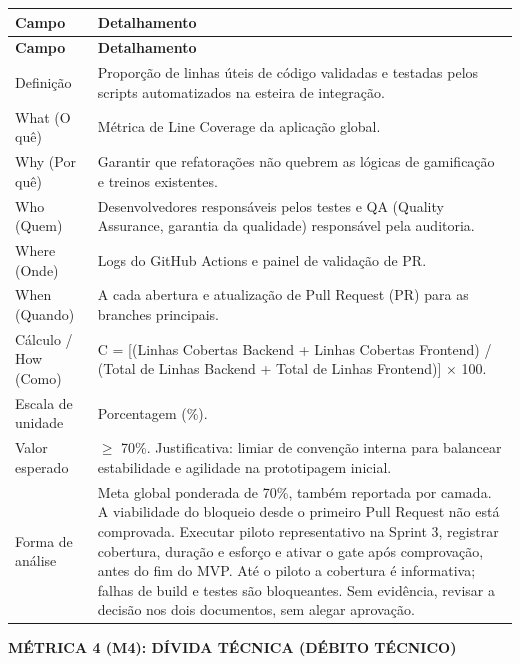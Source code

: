 \begingroup
\small
\setlength{\tabcolsep}{4pt}
\renewcommand{\arraystretch}{1.2}
\begin{longtable}{|>{\raggedright\arraybackslash}p{}|>{\raggedright\arraybackslash}p{}|}
\hline
\textbf{Campo} & \textbf{Detalhamento} \\ \hline
\endfirsthead
\textbf{Campo} & \textbf{Detalhamento} \\ \hline
\endhead
Definição & Proporção de linhas úteis de código validadas e testadas pelos scripts automatizados na esteira de integração. \\ \hline
What (O quê) & Métrica de Line Coverage da aplicação global. \\ \hline
Why (Por quê) & Garantir que refatorações não quebrem as lógicas de gamificação e treinos existentes. \\ \hline
Who (Quem) & Desenvolvedores responsáveis pelos testes e QA (Quality Assurance, garantia da qualidade) responsável pela auditoria. \\ \hline
Where (Onde) & Logs do GitHub Actions e painel de validação de PR. \\ \hline
When (Quando) & A cada abertura e atualização de Pull Request (PR) para as branches principais. \\ \hline
Cálculo / How (Como) & C = [(Linhas Cobertas Backend + Linhas Cobertas Frontend) / (Total de Linhas Backend + Total de Linhas Frontend)] × 100. \\ \hline
Escala de unidade & Porcentagem (\%). \\ \hline
Valor esperado & $\geq$ 70\%. Justificativa: limiar de convenção interna para balancear estabilidade e agilidade na prototipagem inicial. \\ \hline
Forma de análise & Meta global ponderada de 70\%, também reportada por camada. A viabilidade do bloqueio desde o primeiro Pull Request não está comprovada. Executar piloto representativo na Sprint 3, registrar cobertura, duração e esforço e ativar o gate após comprovação, antes do fim do MVP. Até o piloto a cobertura é informativa; falhas de build e testes são bloqueantes. Sem evidência, revisar a decisão nos dois documentos, sem alegar aprovação. \\ \hline
\end{longtable}
\endgroup

\textbf{MÉTRICA 4 (M4): DÍVIDA TÉCNICA (DÉBITO TÉCNICO)}

